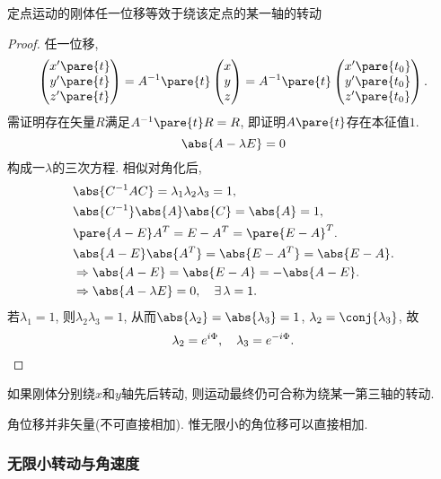 \documentclass[../LectureNotes.tex]{subfiles}
\begin{document}
\begin{theorem}[Euler定理]
    定点运动的刚体任一位移等效于绕该定点的某一轴的转动
\end{theorem}
\begin{proof}
    任一位移,
    \[ \begin{pmatrix}
        x'\pare{t} \\ y'\pare{t} \\ z'\pare{t}
    \end{pmatrix} = A^{-1}\pare{t} \begin{pmatrix}
        x \\ y \\ z
    \end{pmatrix} = A^{-1}\pare{t} \begin{pmatrix}
        x'\pare{t_0} \\ y'\pare{t_0} \\ z'\pare{t_0}
    \end{pmatrix}. \]
    需证明存在矢量$R$满足$A^{-1}\pare{t}R = R$, 即证明$A\pare{t}$存在本征值$1$.
    \[ \abs{A - \lambda E}  = 0 \]
    构成一$\lambda$的三次方程. 相似对角化后,
    \begin{align*}
        & \abs{C^{-1}AC} = \lambda_1 \lambda_2 \lambda_3 = 1, \\
        & \abs{C^{-1}}\abs{A}\abs{C} = \abs{A} = 1, \\
        & \pare{A-E} A^T = E- A^T = \pare{E-A}^T. \\
        & \abs{A-E}\abs{A^T} = \abs{E-A^T} = \abs{E-A}. \\
        & \Rightarrow\abs{A-E} = \abs{E-A} = -\abs{A-E}. \\
        & \Rightarrow \abs{A-\lambda E} = 0,\quad \exists \, \lambda = 1.
    \end{align*}
    若$\lambda_1 = 1$, 则$\lambda_2\lambda_3 = 1$, 从而$\abs{\lambda_2}=\abs{\lambda_3}=1$, $\lambda_2 = \conj{\lambda_3}$, 故
    \[ \lambda_2 = e^{i\Phi},\quad \lambda_3 = e^{-i\Phi}. \qedhere \]
\end{proof}
\begin{remark}
    如果刚体分别绕$x$和$y$轴先后转动, 则运动最终仍可合称为绕某一第三轴的转动.
\end{remark}
\begin{pitfall}
    角位移并非矢量(不可直接相加). 惟无限小的角位移可以直接相加.
\end{pitfall}


\subsubsection{无限小转动与角速度} %
\label{ssub:无限小转动与角速度}
\end{document}
